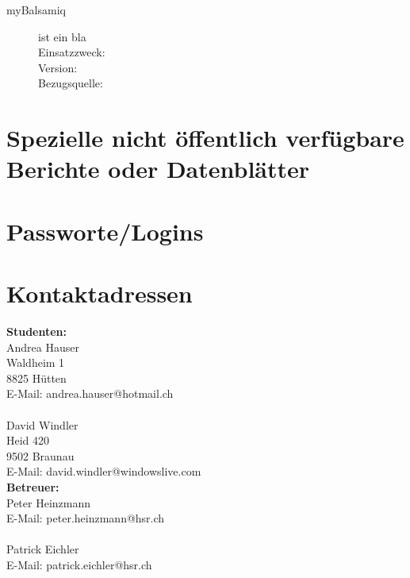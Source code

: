 \documentclass[12pt, a4paper]{report}
\begin{document}
	\begin{description}
		\item [myBalsamiq] ist ein bla \\
		Einsatzzweck: \\
		Version: \\
		Bezugsquelle: \\
	\end{description}
	
	
	
	\chapter{Spezielle nicht öffentlich verfügbare Berichte oder Datenblätter}
	
	\chapter{Passworte/Logins}
	
	\chapter{Kontaktadressen}
	\begin{multicols}{2}
	\noindent \textbf{Studenten:}
	\\
	Andrea Hauser\\
	Waldheim 1\\
	8825 Hütten\\
	E-Mail: andrea.hauser@hotmail.ch\\
	\\
	David Windler\\
	Heid 420\\
	9502 Braunau\\
	\columnbreak
	E-Mail: david.windler@windowslive.com\\
	\textbf{Betreuer:}\\
	Peter Heinzmann\\
	E-Mail: peter.heinzmann@hsr.ch\\
	\\
	Patrick Eichler\\
	E-Mail: patrick.eichler@hsr.ch\\
	
	\end{multicols}
	
\end{document}
